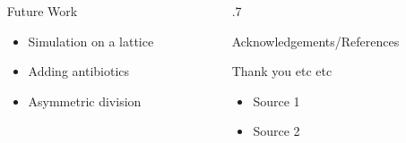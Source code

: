 \documentclass[final]{beamer}
\newlength{\sepwid}
\newlength{\onecolwid}
\begin{document}
\begin{frame}[t]
\begin{block}
\begin{columns}[t]
\begin{column}{\sepwid}\end{column} %

\begin{column}{\onecolwid}
  \begin{alertblock}{Future Work}
    \begin{itemize}
      \item Simulation on a lattice
      \item Adding antibiotics
      \item Asymmetric division
    \end{itemize}

    \vspace{.05ex}
  \end{alertblock}
\end{column}

\begin{column}{\sepwid}\end{column} %

\begin{column}{.7\onecolwid}
  \begin{alertblock}{Acknowledgements/References}

      Thank you etc etc

    \begin{itemize}
      \item Source 1
      \item Source 2
    \end{itemize}
  \end{alertblock}
\end{column}
\end{columns} %
\end{block}


\end{frame} %
\end{document}

